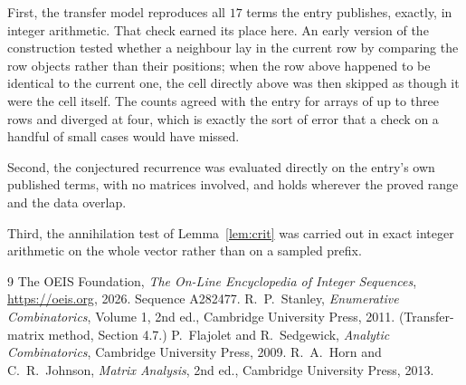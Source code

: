 \documentclass[11pt,a4paper]{article}
\theoremstyle{plain}
\theoremstyle{definition}
\begin{document}
First, the transfer model reproduces all $17$ terms the entry publishes, exactly, in
integer arithmetic. That check earned its place here. An early version of the construction
tested whether a neighbour lay in the current row by comparing the row objects rather
than their positions; when the row above happened to be identical to the current one, the
cell directly above was then skipped as though it were the cell itself. The counts agreed with
the entry for arrays of up to three rows and diverged at four, which is exactly the sort of
error that a check on a handful of small cases would have missed.

Second, the conjectured recurrence was evaluated directly on the entry's own published terms,
with no matrices involved, and holds wherever the proved range and the data overlap.

Third, the annihilation test of Lemma~\ref{lem:crit} was carried out in exact integer
arithmetic on the whole vector rather than on a sampled prefix.

\begin{thebibliography}{9}
 The OEIS Foundation, \emph{The On-Line Encyclopedia of Integer
Sequences}, \url{https://oeis.org}, 2026. Sequence A282477.
 R.~P.~Stanley, \emph{Enumerative Combinatorics}, Volume 1, 2nd ed.,
Cambridge University Press, 2011. (Transfer-matrix method, Section 4.7.)
 P.~Flajolet and R.~Sedgewick, \emph{Analytic Combinatorics}, Cambridge
University Press, 2009.
 R.~A.~Horn and C.~R.~Johnson, \emph{Matrix Analysis}, 2nd ed., Cambridge
University Press, 2013.
\end{thebibliography}
\end{document}
